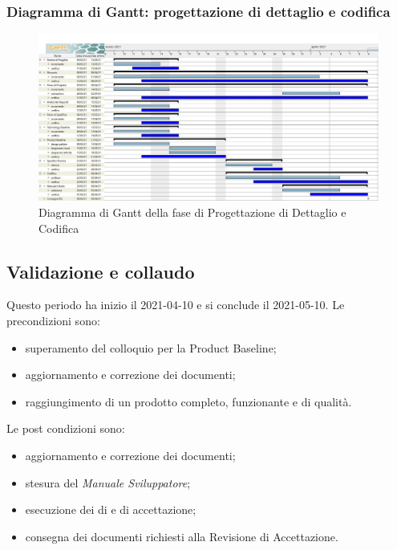 \subsubsection{Diagramma di Gantt: progettazione di dettaglio e codifica}
\begin{figure}[H]
    \centering
    \includegraphics[scale = 0.25]{components/img/progettazione_dettaglio_codifica.jpg}
    \caption{Diagramma di Gantt della fase di Progettazione di Dettaglio e Codifica}
    \label{fig:\glo{Diagramma di Gantt}, fase di Progettazione di dettaglio e codifica}
\end{figure}

\newpage
\subsection{Validazione e collaudo}
Questo periodo ha inizio il 2021-04-10 e si conclude il 2021-05-10.
Le precondizioni sono:
\begin{itemize}
	\item superamento del colloquio per la Product Baseline;
	\item aggiornamento e correzione dei documenti;
	\item raggiungimento di un prodotto completo, funzionante e di qualità.
\end{itemize}
Le post condizioni sono:
\begin{itemize}
	\item aggiornamento e correzione dei documenti;
	\item stesura del \textit{Manuale Sviluppatore};
	\item esecuzione dei  di  e di accettazione;
	\item consegna dei documenti richiesti alla Revisione di Accettazione.
\end{itemize}
